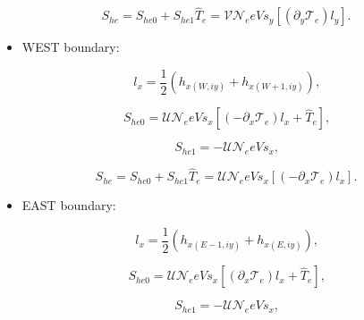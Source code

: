 \documentclass[11pt]{article}
\begin{document}
\begin{equation}
S_{he}=S_{he0}+S_{he1}\widehat{T}_{e}=\mathcal{VN}_{e}eVs_{y}\left[ \left(
\partial_{y}\mathcal{T}_{e}\right) l_{y}\right] \text{.}   \label{c174}
\end{equation}

\bigskip

\begin{itemize}
\item  WEST boundary:
\end{itemize}

\bigskip

\begin{equation}
l_{x}=\frac{1}{2}\left( h_{x\left( W,iy\right) }+h_{x\left( W+1,iy\right)
}\right) \text{,}   \label{c175a}
\end{equation}

\begin{equation}
S_{he0}=\mathcal{UN}_{e}eVs_{x}\left[ \left( -\partial_{x}\mathcal{T}%
_{e}\right) l_{x}+\widehat{T}_{e}\right] \text{,}   \label{c175}
\end{equation}

\begin{equation}
S_{he1}=-\mathcal{UN}_{e}eVs_{x}\text{,}   \label{c176}
\end{equation}

\begin{equation}
S_{he}=S_{he0}+S_{he1}\widehat{T}_{e}=\mathcal{UN}_{e}eVs_{x}\left[ \left(
-\partial_{x}\mathcal{T}_{e}\right) l_{x}\right] \text{.}   \label{c177}
\end{equation}

\bigskip

\begin{itemize}
\item  EAST boundary:
\end{itemize}

\bigskip

\begin{equation}
l_{x}=\frac{1}{2}\left( h_{x\left( E-1,iy\right) }+h_{x\left( E,iy\right)
}\right) \text{,}   \label{c178a}
\end{equation}

\begin{equation}
S_{he0}=\mathcal{UN}_{e}eVs_{x}\left[ \left( \partial_{x}\mathcal{T}%
_{e}\right) l_{x}+\widehat{T}_{e}\right] \text{,}   \label{c178}
\end{equation}

\begin{equation}
S_{he1}=-\mathcal{UN}_{e}eVs_{x}\text{,}   \label{c179}
\end{equation}
\end{document}
